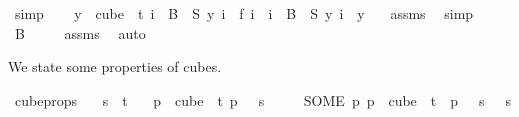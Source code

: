 \begin{isabellebody}
\ simp\isanewline
{}\isamarkupfalse%
\isanewline
\ \ \isamarkupfalse%
\ {\isachardoublequoteopen}{\isacharparenleft}{\kern0pt}{\isasymforall}y\ {\isasymin}\ cube\ {}\ t{\isachardot}{\kern0pt}\ {\isacharparenleft}{\kern0pt}{\isasymforall}i\ {\isasymin}\ B\ {}{\isachardot}{\kern0pt}\ S\ y\ i\ {\isacharequal}{\kern0pt}\ f\ i{\isacharparenright}{\kern0pt}\ {\isasymand}\ {\isacharparenleft}{\kern0pt}{\isasymforall}i\ {\isasymin}\ B\ {}{\isachardot}{\kern0pt}\ {\isacharparenleft}{\kern0pt}S\ y{\isacharparenright}{\kern0pt}\ i\ {\isacharequal}{\kern0pt}\ y\ {}{\isacharparenright}{\kern0pt}{\isacharparenright}{\kern0pt}{\isachardoublequoteclose}\ \isamarkupfalse%
\ assms{\isacharparenleft}{\kern0pt}{}{\isacharparenright}{\kern0pt}\ \isamarkupfalse%
\ simp\isanewline
{}\isamarkupfalse%
\isanewline
\ \ \isamarkupfalse%
\ {\isachardoublequoteopen}B\ {}\ {\isasymnoteq}\ {\isacharbraceleft}{\kern0pt}{\isacharbraceright}{\kern0pt}{\isachardoublequoteclose}\ \isamarkupfalse%
\ assms{\isacharparenleft}{\kern0pt}{}{\isacharparenright}{\kern0pt}\ \isamarkupfalse%
\ auto\isanewline
{}\isamarkupfalse%
%
\endisatagproof
{\isafoldproof}%
%
\isadelimproof
%
\endisadelimproof
%
\begin{isamarkuptext}%
We state some properties of cubes.%
\end{isamarkuptext}\isamarkuptrue%
\isamarkupfalse%
\ cube{\isacharunderscore}{\kern0pt}props{\isacharcolon}{\kern0pt}\isanewline
\ \ \ {\isachardoublequoteopen}s\ {\isacharless}{\kern0pt}\ t{\isachardoublequoteclose}\isanewline
\ \ \ {\isachardoublequoteopen}{\isasymexists}p\ {\isasymin}\ cube\ {}\ t{\isachardot}{\kern0pt}\ p\ {}\ {\isacharequal}{\kern0pt}\ s{\isachardoublequoteclose}\isanewline
\ \ \ \ \ {\isachardoublequoteopen}{\isacharparenleft}{\kern0pt}SOME\ p{\isachardot}{\kern0pt}\ p\ {\isasymin}\ cube\ {}\ t\ {\isasymand}\ p\ {}\ {\isacharequal}{\kern0pt}\ s{\isacharparenright}{\kern0pt}\ {}\ {\isacharequal}{\kern0pt}\ s{\isachardoublequoteclose}\isanewline

\end{isabellebody}
